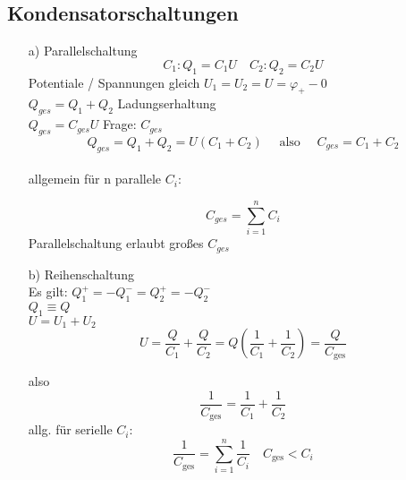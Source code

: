 \documentclass[titlepage,12pt,a4paper,ngerman]{report}
\newcommand{\tx}[1]{\textrm{#1}}
\begin{document}
\subsection{Kondensatorschaltungen}
\begin{itemize}
\item[a)] Parallelschaltung
$$C_1:  Q_1 = C_1 U \quad C_2: Q_2 = C_2 U$$
Potentiale / Spannungen gleich $U_1 = U_2 = U = \varphi_+-0$\\
$Q_{ges} = Q_1 + Q_2$ Ladungserhaltung\\
$Q_{ges} = C_{ges} U $ Frage: $C_{ges}$\\
$$Q_{ges} = Q_1 + Q_2 = U(C_1 + C_2) \quad \tx{ also } \quad C_{ges} = C_1 + C_2$$\\
allgemein für n parallele $C_i$: 

$$C_{ges} = \sum_{i=1}^{n}C_i$$
Parallelschaltung erlaubt großes $C_{ges}$\\

\item[b)] Reihenschaltung\\
Es gilt: $ Q^+_1 = - Q_1^- = Q_2^+ = -Q_2^-$\\
$Q_1 \equiv Q$\\
$ U = U_1 + U_2$
$$ U = \frac{Q}{C_1} + \frac{Q}{C_2} = Q(\frac{1}{C_1} + \frac{1}{C_2}) = \frac{Q}{C_{\tx{ges}}}$$

also $$ \frac{1}{C_{\tx{ges}}} = \frac{1}{C_1} + \frac{1}{C_2}$$
allg. für serielle $C_i$:
$$ \frac{1}{C_{\tx{ges}}} = \sum^n_{i=1} \frac{1}{C_i} \quad C_{\tx{ges}} < C_i$$




\end{itemize}
\end{document}
